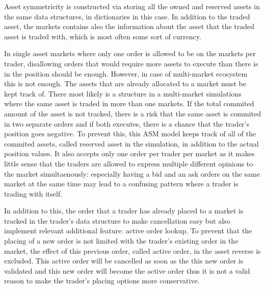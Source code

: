 Asset symmetricity is constructed via storing all the owned and reserved
assets in the same data structures, in dictionaries in this case. In addition
to the traded asset, the markets contains also the information about the asset
that the traded asset is traded with, which is most often some sort of currency. 

In single asset markets where only one order is allowed to be on the markets
per trader, disallowing orders that would require more assets to execute
than there is in the position should be enough. However, in case of multi-market
ecosystem this is not enough. The assets that are already allocated to 
a market must be kept track of. There most likely is a structure in a multi-market
simulations where the same asset is traded in more than one markets. If the
total commited amount of the asset is not tracked, there is a risk that the
same asset is commited in two separate orders and if both executes,
there is a chance that the trader's position goes negative. To prevent this,
this ASM model keeps track of all of the commited assets, called reserved
asset in the simulation, in addition to the actual position values. It also
accepts only one order per trader per market as it makes little sense that
the traders are allowed to express multiple different opinions to the market 
simultaenously: especially having a bid and an ask orders on the same market
at the same time may lead to a confusing pattern where a trader is trading with
itself. 

In addition to this, the order that a trader has already placed
to a market is tracked in the trader's data structure to make cancellation easy
but also implement relevant additional feature: active order lookup. To prevent that
the placing of a new order is not limited with the trader's existing order in the market,
the effect of this previous order, called active order, in the asset reverse is excluded. 
This active order will be cancelled as soon as the this new order is validated and this new order
will become the active order thus it is not a valid reason to make the trader's placing 
options more conservative.

